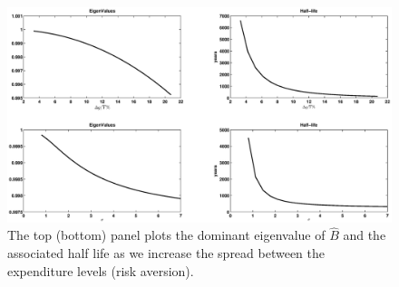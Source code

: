 \documentclass[thmsb,11pt]{article}
\begin{document}
  \begin{figure}[htp]
 \centering
 \includegraphics[width=\textwidth]{Draft25Graphs/eigenvalues.eps}
 \caption{The top (bottom) panel plots the dominant eigenvalue of $\hat{B}$ and the associated half life as we increase
the spread between the expenditure levels (risk aversion). }
 \label{fig: Eigenvalues}
 \end{figure}
\end{document}
